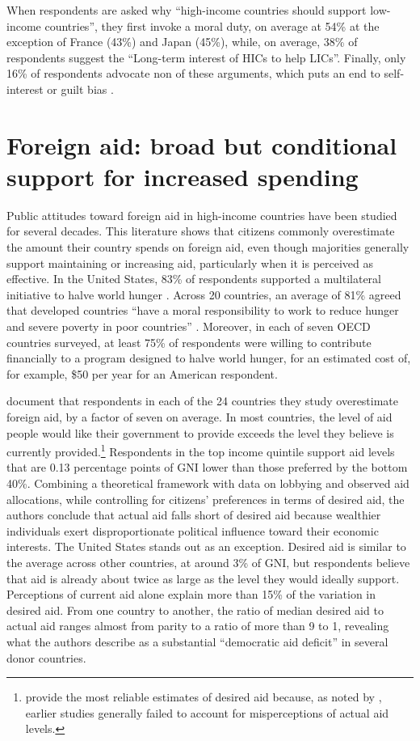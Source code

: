 \documentclass[11pt,a4paper]{article}
\begin{document}
When respondents are asked why ``high-income countries should support low-income countries'', they first invoke a moral duty, on average at 54\% at the exception of France (43\%) and Japan (45\%), while, on average, 38\% of respondents suggest the ``Long-term interest of HICs to help LICs''. Finally, only 16\% of respondents advocate non of these arguments, which puts an end to self-interest or guilt bias \citep{fabre_public_2026}.

\section{Foreign aid: broad but conditional support for increased spending}

Public attitudes toward foreign aid in high-income countries have been studied for several decades. This literature shows that citizens commonly overestimate the amount their country spends on foreign aid, even though majorities generally support maintaining or increasing aid, particularly when it is perceived as effective. In the United States, 83\% of respondents supported a multilateral initiative to halve world hunger \citep{PIPA2001}. Across 20 countries, an average of 81\% agreed that developed countries ``have a moral responsibility to work to reduce hunger and severe poverty in poor countries'' \citep{PIPA2008}. Moreover, in each of seven OECD countries surveyed, at least 75\% of respondents were willing to contribute financially to a program designed to halve world hunger, for an estimated cost of, for example, \$50 per year for an American respondent.

\citet{kaufmann_foreign_2019} document that respondents in each of the 24 countries they study overestimate foreign aid, by a factor of seven on average. In most countries, the level of aid people would like their government to provide exceeds the level they believe is currently provided.\footnote{\citet{kaufmann_foreign_2012} provide the most reliable estimates of desired aid because, as noted by \citet{hudson_mile_2012}, earlier studies generally failed to account for misperceptions of actual aid levels.} Respondents in the top income quintile support aid levels that are 0.13 percentage points of GNI lower than those preferred by the bottom 40\%. Combining a theoretical framework with data on lobbying and observed aid allocations, while controlling for citizens' preferences in terms of desired aid, the authors conclude that actual aid falls short of desired aid because wealthier individuals exert disproportionate political influence toward their economic interests. The United States stands out as an exception. Desired aid is similar to the average across other countries, at around 3\% of GNI, but respondents believe that aid is already about twice as large as the level they would ideally support. Perceptions of current aid alone explain more than 15\% of the variation in desired aid. From one country to another, the ratio of median desired aid to actual aid ranges almost from parity to a ratio of more than 9 to 1, revealing what the authors describe as a substantial ``democratic aid deficit'' in several donor countries.
\end{document}
